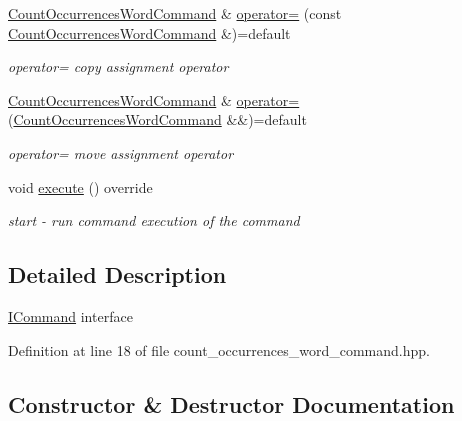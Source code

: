 \begin{DoxyCompactItemize}
\hyperlink{classtwo__gis__test_1_1command__handler_1_1_count_occurrences_word_command}{Count\+Occurrences\+Word\+Command} \& \hyperlink{classtwo__gis__test_1_1command__handler_1_1_count_occurrences_word_command_afa3993b6f75a0090bafde445e61c1e8a}{operator=} (const \hyperlink{classtwo__gis__test_1_1command__handler_1_1_count_occurrences_word_command}{Count\+Occurrences\+Word\+Command} \&)=default
\begin{DoxyCompactList}\small\item\em operator= copy assignment operator \end{DoxyCompactList}\item 
\hyperlink{classtwo__gis__test_1_1command__handler_1_1_count_occurrences_word_command}{Count\+Occurrences\+Word\+Command} \& \hyperlink{classtwo__gis__test_1_1command__handler_1_1_count_occurrences_word_command_a62e184ff22ad93cd7ff17a9c30321d11}{operator=} (\hyperlink{classtwo__gis__test_1_1command__handler_1_1_count_occurrences_word_command}{Count\+Occurrences\+Word\+Command} \&\&)=default
\begin{DoxyCompactList}\small\item\em operator= move assignment operator \end{DoxyCompactList}\item 
void \hyperlink{classtwo__gis__test_1_1command__handler_1_1_count_occurrences_word_command_a1933874918ecfc6090f8512abca372b3}{execute} () override
\begin{DoxyCompactList}\small\item\em start -\/ run command execution of the command \end{DoxyCompactList}\end{DoxyCompactItemize}


\subsection{Detailed Description}
\hyperlink{classtwo__gis__test_1_1command__handler_1_1_i_command}{I\+Command} interface 

Definition at line 18 of file count\+\_\+occurrences\+\_\+word\+\_\+command.\+hpp.



\subsection{Constructor \& Destructor Documentation}
